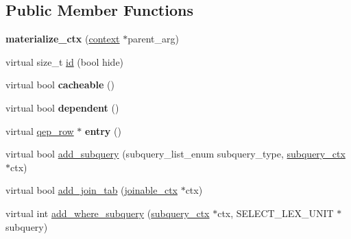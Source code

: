 \subsection*{Public Member Functions}
\begin{DoxyCompactItemize}
\item 
\mbox{\label{classopt__explain__json__namespace_1_1materialize__ctx_aa2840f5a300e9cce1ae7bbe2b4e143ed}} 
{\bfseries materialize\+\_\+ctx} (\mbox{\hyperlink{classopt__explain__json__namespace_1_1context}{context}} $\ast$parent\+\_\+arg)
\item 
virtual size\+\_\+t \mbox{\hyperlink{classopt__explain__json__namespace_1_1materialize__ctx_ae1e9e31aa9072cf01733c417a1821773}{id}} (bool hide)
\item 
\mbox{\label{classopt__explain__json__namespace_1_1materialize__ctx_a3b56bb399c1243b41eed1896ade72c49}} 
virtual bool {\bfseries cacheable} ()
\item 
\mbox{\label{classopt__explain__json__namespace_1_1materialize__ctx_a3d8e0d62cf270796ec392013281612ea}} 
virtual bool {\bfseries dependent} ()
\item 
\mbox{\label{classopt__explain__json__namespace_1_1materialize__ctx_a0d99e0eeee14633ba80106cf8a638fda}} 
virtual \mbox{\hyperlink{classqep__row}{qep\+\_\+row}} $\ast$ {\bfseries entry} ()
\item 
virtual bool \mbox{\hyperlink{classopt__explain__json__namespace_1_1materialize__ctx_adcc1a9841e17f5abf74faf8d719d9700}{add\+\_\+subquery}} (subquery\+\_\+list\+\_\+enum subquery\+\_\+type, \mbox{\hyperlink{classopt__explain__json__namespace_1_1subquery__ctx}{subquery\+\_\+ctx}} $\ast$ctx)
\item 
virtual bool \mbox{\hyperlink{classopt__explain__json__namespace_1_1materialize__ctx_ac078469c04990cd7639ab09c585809d9}{add\+\_\+join\+\_\+tab}} (\mbox{\hyperlink{classopt__explain__json__namespace_1_1joinable__ctx}{joinable\+\_\+ctx}} $\ast$ctx)
\item 
virtual int \mbox{\hyperlink{classopt__explain__json__namespace_1_1materialize__ctx_ae6715f07cfd160747433ad80fd78deac}{add\+\_\+where\+\_\+subquery}} (\mbox{\hyperlink{classopt__explain__json__namespace_1_1subquery__ctx}{subquery\+\_\+ctx}} $\ast$ctx, S\+E\+L\+E\+C\+T\+\_\+\+L\+E\+X\+\_\+\+U\+N\+IT $\ast$subquery)

\end{DoxyCompactItemize}
